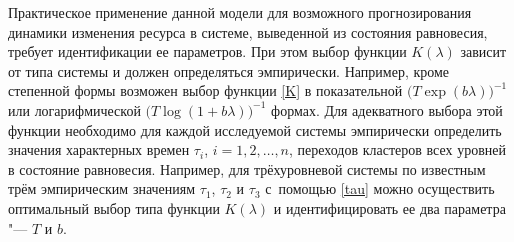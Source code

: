 Практическое применение данной модели для возможного
прогнозирования динамики изменения ресурса в системе, выведенной из
состояния равновесия, требует идентификации ее параметров. При этом
выбор функции $K(\lambda)$ зависит от типа системы и должен
определяться эмпирически. Например, кроме степенной формы возможен
выбор функции \eqref{K} в показательной
$\bigl({T\exp\left(b\lambda\right)}\bigr)^{-1}$ или логарифмической
$\bigl({T\log\left(1+b\lambda\right)}\bigr)^{-1}$ формах. Для адекватного
выбора этой функции необходимо для каждой исследуемой системы
эмпирически определить значения характерных времен $\tau_i$,
$i=1, 2, \ldots,n$, переходов кластеров всех уровней в состояние
равновесия. Например, для трёхуровневой системы по известным трём
эмпирическим значениям  $\tau_1$, $\tau_2$ и $\tau_3$ с~помощью
\eqref{tau} можно осуществить оптимальный выбор типа функции
$K(\lambda)$ и идентифицировать ее два параметра "--- $T$ и $b$.

\smallskip

